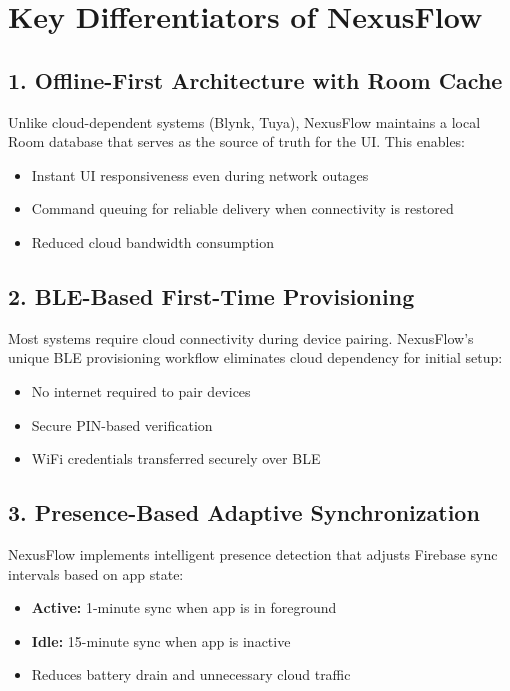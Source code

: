 \section{Key Differentiators of NexusFlow}

\subsection{1. Offline-First Architecture with Room Cache}

Unlike cloud-dependent systems (Blynk, Tuya), NexusFlow maintains a local Room database that serves as the source of truth for the UI. This enables:

\begin{itemize}
    \item Instant UI responsiveness even during network outages
    \item Command queuing for reliable delivery when connectivity is restored
    \item Reduced cloud bandwidth consumption
\end{itemize}

\subsection{2. BLE-Based First-Time Provisioning}

Most systems require cloud connectivity during device pairing. NexusFlow's unique BLE provisioning workflow eliminates cloud dependency for initial setup:

\begin{itemize}
    \item No internet required to pair devices
    \item Secure PIN-based verification
    \item WiFi credentials transferred securely over BLE
\end{itemize}

\subsection{3. Presence-Based Adaptive Synchronization}

NexusFlow implements intelligent presence detection that adjusts Firebase sync intervals based on app state:

\begin{itemize}
    \item \textbf{Active:} 1-minute sync when app is in foreground
    \item \textbf{Idle:} 15-minute sync when app is inactive
    \item Reduces battery drain and unnecessary cloud traffic
\end{itemize}

